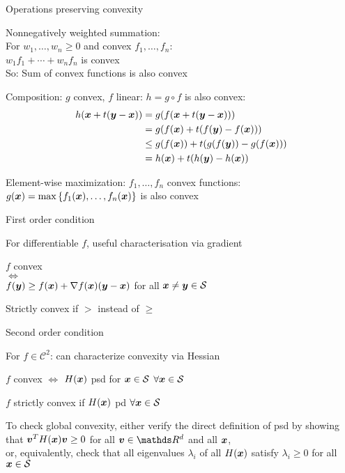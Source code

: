 \documentclass[11pt,compress,t,notes=noshow, xcolor=table]{beamer}
\begin{document}
\begin{framei}{Operations preserving convexity}  
\item Nonnegatively weighted summation:\\
For $w_1,\ldots,w_n\geq0$ and convex $f_1,\ldots,f_n$:\\
$w_1f_1 + \cdots + w_nf_n$ is convex \\
So: Sum of convex functions is also convex
\item Composition: $g$ convex, $f$ linear: $h = g \circ f$ is also convex:
\begin{align*}
h(\bm{x} + t(\bm{y}-\bm{x})) &= g(f(\bm{x} + t(\bm{y}-\bm{x}))) \\
&= g(f(\bm{x}) + t(f(\bm{y}) - f(\bm{x}))) \\
&\leq g(f(\bm{x})) + t(g(f(\bm{y})) - g(f(\bm{x}))) \\
&= h(\bm{x}) + t(h(\bm{y}) - h(\bm{x}))
\end{align*}
\item Element-wise maximization: $f_1,\ldots,f_n$ convex functions: $g(\bm{x}) = \max\left\lbrace f_1(\bm{x}),\ldots,f_n(\bm{x}) \right\rbrace$ is also convex
\end{framei}


\begin{framei}{First order condition}
\item For differentiable $f$, useful characterisation via gradient
\item $f$ convex \\
$\Longleftrightarrow$ \\
$f(\bm{y}) \geq f(\bm{x}) + \nabla f(\bm{x}) (\bm{y}-\bm{x})$ for all $\bm{x} \ne \bm{y} \in \mathcal{S}$
\item Strictly convex if $>$ instead of $\ge$
\end{framei}


\begin{framei}{Second order condition}
\item For $f \in \mathcal{C}^2$: can characterize convexity via Hessian
\item $f$ convex $\Longleftrightarrow$ $H(\bm{x})$ psd for $\bm{x} \in \mathcal{S}$ $\forall \bm{x} \in \mathcal{S}$
\item $f$ strictly convex if $H(\bm{x})$ pd $\forall \bm{x} \in \mathcal{S}$
\lz
\item To check global convexity, either verify the direct definition of psd by showing that $\bm{v}^T H(\bm{x}) \bm{v} \geq 0$ for all $\bm{v} \in \R^d$ and all $\bm{x}$,\\
or, equivalently, check that all eigenvalues $\lambda_i$ of all $H(\bm{x})$ satisfy $\lambda_i \geq 0$ for all $\bm{x} \in \mathcal{S}$
\end{framei}
\end{document}
